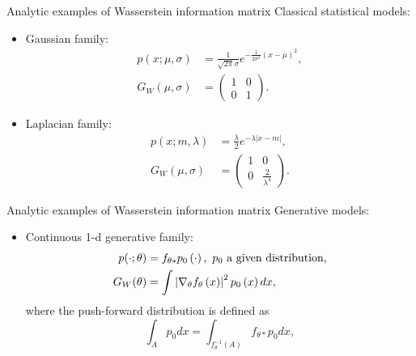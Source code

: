 \documentclass{beamer}
\begin{document}
\begin{frame}{Analytic examples of Wasserstein information matrix}
    Classical statistical models:
    \begin{itemize}
        \item Gaussian family:
        \begin{equation*}
            \begin{aligned}
                p(x;\mu,\sigma) & = \frac{1}{\sqrt{2\pi} \sigma}e^{-\frac{1}{2\sigma^2}(x-\mu)^2},            \\
                G_W(\mu,\sigma)& = \begin{pmatrix}
                1& 0 \\
                0 &  1
                \end{pmatrix}.
            \end{aligned}
        \end{equation*}
        \item Laplacian family:
        \begin{equation*}
            \begin{aligned}
                p(x;m,\lambda) & = \frac{\lambda}{2}e^{-\lambda|x-m|},            \\ G_W(\mu,\sigma)& = \begin{pmatrix}
                1& 0 \\
                0 &  \frac{2}{\lambda^4}
                \end{pmatrix}.
            \end{aligned}
        \end{equation*}
    \end{itemize}
\end{frame}

\begin{frame}{Analytic examples of Wasserstein information matrix}
    Generative models:
    \begin{itemize}
        \item Continuous 1-d generative family:
        \begin{equation*}
            \begin{aligned}
                p(\cdot;\theta) & = f_{\theta *}p_0\lp \cdot \rp,\ p_0 \text{ a given distribution,}            \\
                G_W(\theta) & = \int \lv \nabla_{\theta} f_{\theta}\lp x\rp \rv^2 p_0\lp x \rp dx,
            \end{aligned}
        \end{equation*}
        where the push-forward distribution is defined as
        \begin{equation*}
    \int_{A}p_0dx = \int_{f_{\theta }^{-1}(A)}f_{\theta *}p_0dx,
        \end{equation*}
    \end{itemize}
\end{frame}
\end{document}
